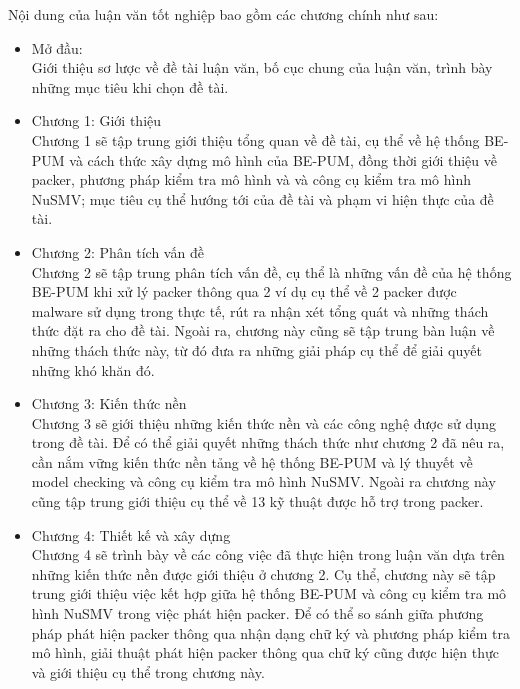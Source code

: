 Nội dung của luận văn tốt nghiệp bao gồm các chương chính như sau:

\begin{itemize}[leftmargin=*]
\item{Mở đầu:\\
\hspace*{0.5cm}Giới thiệu sơ lược về đề tài luận văn, bố cục chung của luận văn, trình bày những mục tiêu khi chọn đề tài.\\}
\item{Chương 1: Giới thiệu\\
\hspace*{0.5cm}Chương 1 sẽ tập trung giới thiệu tổng quan về đề tài, cụ thể về hệ thống BE-PUM và cách thức xây dựng mô hình của BE-PUM, đồng thời giới thiệu về packer, phương pháp kiểm tra mô hình và và công cụ kiểm tra mô hình NuSMV; mục tiêu cụ thể hướng tới của đề tài và phạm vi hiện thực của đề tài.\\}
\item{Chương 2: Phân tích vấn đề\\
\hspace*{0.5cm}Chương 2 sẽ tập trung phân tích vấn đề, cụ thể là những vấn đề của hệ thống BE-PUM khi xử lý packer thông qua 2 ví dụ cụ thể về 2 packer được malware sử dụng trong thực tế, rút ra nhận xét tổng quát và những thách thức đặt ra cho đề tài. Ngoài ra, chương này cũng sẽ tập trung bàn luận về những thách thức này, từ đó đưa ra những giải pháp cụ thể để giải quyết những khó khăn đó.\\}
\item{Chương 3: Kiến thức nền\\
\hspace*{0.5cm}Chương 3 sẽ giới thiệu những kiến thức nền và các công nghệ được sử dụng trong đề tài. Để có thể giải quyết những thách thức như chương 2 đã nêu ra, cần nắm vững kiến thức nền tảng về hệ thống BE-PUM và lý thuyết về model checking và công cụ kiểm tra mô hình NuSMV. Ngoài ra chương này cũng tập trung giới thiệu cụ thể về 13 kỹ thuật được hỗ trợ trong packer.\\}
\item{Chương 4: Thiết kế và xây dựng\\
\hspace*{0.5cm}Chương 4 sẽ trình bày về các công việc đã thực hiện trong luận văn dựa trên những kiến thức nền được giới thiệu ở chương 2. Cụ thể, chương này sẽ tập trung giới thiệu việc kết hợp giữa hệ thống BE-PUM và công cụ kiểm tra mô hình NuSMV trong việc phát hiện packer. Để có thể so sánh giữa phương pháp phát hiện packer thông qua nhận dạng chữ ký và phương pháp kiểm tra mô hình, giải thuật phát hiện packer thông qua chữ ký cũng được hiện thực và giới thiệu cụ thể trong chương này.\\}

\end{itemize}

